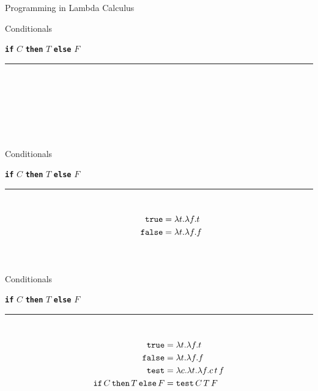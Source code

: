 \documentclass{beamer}
\newcommand{\kw}[1]{{\bf \texttt{#1}}}
\newcommand{\mkw}[1]{{\bf \mathtt{#1}}}
\newcommand{\msym}[1]{\mathtt{#1}}
\newcommand{\hr}[0]{\rule{10.75cm}{0.4pt}\\}
\begin{document}
\begin{frame}{Programming in Lambda Calculus}
\begin{center}
\end{center}
\end{frame}
\begin{frame}{Conditionals}
\begin{center}
\kw{if} $C$ \kw{then} $T$ \kw{else} $F$
\end{center}
\hr
\begin{align*}
\phantom{\msym{true}  = \lambda t.\lambda f.t} \\
\phantom{\msym{false} = \lambda t.\lambda f.f} \\
\phantom{\msym{test} = \lambda c.\lambda t.\lambda f.c\,t\,f} \\
\phantom{\mkw{if}\,C\,\mkw{then}\,T\,\mkw{else}\,F = \msym{test}\,C\,T\,F}
\end{align*}
\end{frame}
\begin{frame}{Conditionals}
\begin{center}
\kw{if} $C$ \kw{then} $T$ \kw{else} $F$
\end{center}
\hr
\begin{align*}
\msym{true}  &= \lambda t.\lambda f.t \\
\msym{false} &= \lambda t.\lambda f.f
\phantom{\msym{test} = \lambda c.\lambda t.\lambda f.c\,t\,f} \\\\
\phantom{\mkw{if}\,C\,\mkw{then}\,T\,\mkw{else}\,F = \msym{test}\,C\,T\,F}
\end{align*}
\end{frame}
\begin{frame}{Conditionals}
\begin{center}
\kw{if} $C$ \kw{then} $T$ \kw{else} $F$
\end{center}
\hr
\begin{align*}
\msym{true}  &= \lambda t.\lambda f.t \\
\msym{false} &= \lambda t.\lambda f.f \\
\msym{test} &= \lambda c.\lambda t.\lambda f.c\,t\,f \\
\mkw{if}\,C\,\mkw{then}\,T\,\mkw{else}\,F &= \msym{test}\,C\,T\,F
\end{align*}
\end{frame}
\end{document}
